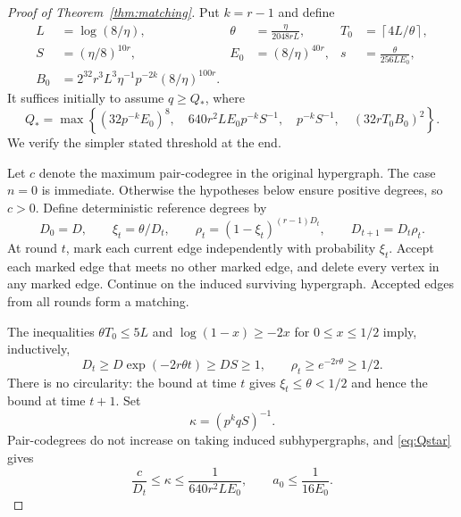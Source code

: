 \documentclass[11pt]{article}
\theoremstyle{remark}
\newcommand{\ceil}[1]{\left\lceil #1\right\rceil}
\begin{document}
\begin{proof}[Proof of Theorem~\ref{thm:matching}]
Put $k=r-1$ and define
\begin{align*}
 L&=\log(8/\eta),&
 \theta&=\frac{\eta}{2048rL},&
 T_0&=\ceil{4L/\theta},\\
 S&=(\eta/8)^{10r},&
 E_0&=(8/\eta)^{40r},&
 s&=\frac{\theta}{256LE_0},\\
 B_0&=2^{32}r^3L^3\eta^{-1}p^{-2k}(8/\eta)^{100r}.
\end{align*}
It suffices initially to assume $q\ge Q_*$, where
\begin{equation}\label{eq:Qstar}
 Q_* =\max\left\{
 (32p^{-k}E_0)^8,\quad
 640r^2LE_0p^{-k}S^{-1},\quad
 p^{-k}S^{-1},\quad
 (32rT_0B_0)^2\right\}.
\end{equation}
We verify the simpler stated threshold at the end.

Let $c$ denote the maximum pair-codegree in the original hypergraph. The
case $n=0$ is immediate. Otherwise the hypotheses below ensure positive
degrees, so $c>0$. Define deterministic reference degrees by
\[
 D_0=D,\qquad \xi_t=\theta/D_t,\qquad
 \rho_t=(1-\xi_t)^{(r-1)D_t},\qquad D_{t+1}=D_t\rho_t.
\]
At round $t$, mark each current edge independently with probability $\xi_t$.
Accept each marked edge that meets no other marked edge, and delete every
vertex in any marked edge. Continue on the induced surviving hypergraph.
Accepted edges from all rounds form a matching.

The inequalities $\theta T_0\le5L$ and $\log(1-x)\ge-2x$ for
$0\le x\le1/2$ imply, inductively,
\begin{equation}\label{eq:reference-degree}
 D_t\ge D\exp(-2r\theta t)\ge DS\ge1,
 \qquad \rho_t\ge e^{-2r\theta}\ge1/2.
\end{equation}
There is no circularity: the bound at time $t$ gives $\xi_t\le\theta<1/2$
and hence the bound at time $t+1$. Set
\[
 \kappa=(p^kqS)^{-1}.
\]
Pair-codegrees do not increase on taking induced subhypergraphs, and
\eqref{eq:Qstar} gives
\begin{equation}\label{eq:initial-smallness}
 \frac c{D_t}\le\kappa\le\frac1{640r^2LE_0},
 \qquad a_0\le\frac1{16E_0}.
\end{equation}


\end{proof}
\end{document}
